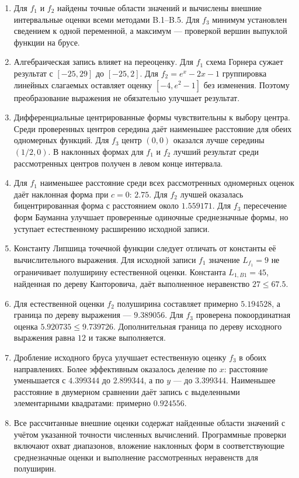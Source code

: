 \documentclass[12pt,a4paper]{article}
\begin{document}
\begin{enumerate}
\item Для $f_1$ и $f_2$ найдены точные области значений и вычислены
внешние интервальные оценки всеми методами B.1--B.5.
Для $f_3$ минимум установлен сведением к одной переменной,
а максимум --- проверкой вершин выпуклой функции на брусе.

\item Алгебраическая запись влияет на переоценку. Для $f_1$
схема Горнера сужает результат с $[-25,29]$ до $[-25,2]$.
Для $f_2=e^x-2x-1$ группировка линейных слагаемых оставляет
оценку $[-4,e^2-1]$ без изменения. Поэтому преобразование
выражения не обязательно улучшает результат.

\item Дифференциальные центрированные формы чувствительны
к выбору центра. Среди проверенных центров середина даёт
наименьшее расстояние для обеих одномерных функций.
Для $f_3$ центр $(0,0)$ оказался лучше середины $(1/2,0)$.
В наклонных формах для $f_1$ и $f_2$ лучший результат среди
рассмотренных центров получен в левом конце интервала.

\item Для $f_1$ наименьшее расстояние среди всех рассмотренных
одномерных оценок даёт наклонная форма при $c=0$: $2.75$.
Для $f_2$ лучшей оказалась бицентрированная форма с расстоянием
около $1.559171$. Для $f_3$ пересечение форм Бауманна улучшает
проверенные одиночные среднезначные формы, но уступает
естественному расширению исходной записи.

\item Константу Липшица точечной функции следует отличать
от константы её вычислительного выражения. Для исходной записи
$f_1$ значение $L_{f_1}=9$ не ограничивает полуширину
естественной оценки. Константа $L_{1,B1}=45$, найденная
по дереву Канторовича, даёт выполненное неравенство $27\leq67.5$.

\item Для естественной оценки $f_2$ полуширина составляет
примерно $5.194528$, а граница по дереву выражения --- $9.389056$.
Для $f_3$ проверена покоординатная оценка
$5.920735\leq9.739726$. Дополнительная граница по дереву
исходного выражения равна $12$ и также выполняется.

\item Дробление исходного бруса улучшает естественную оценку
$f_3$ в обоих направлениях. Более эффективным оказалось деление
по $x$: расстояние уменьшается с $4.399344$ до $2.899344$,
а по $y$ --- до $3.399344$. Наименьшее расстояние в двумерном
сравнении даёт запись с выделенными элементарными квадратами:
примерно $0.924556$.

\item Все рассчитанные внешние оценки содержат найденные
области значений с учётом указанной точности численных вычислений.
Программные проверки включают охват диапазонов, вложение
наклонных форм в соответствующие среднезначные оценки
и выполнение рассмотренных неравенств для полуширин.
\end{enumerate}
\end{document}
